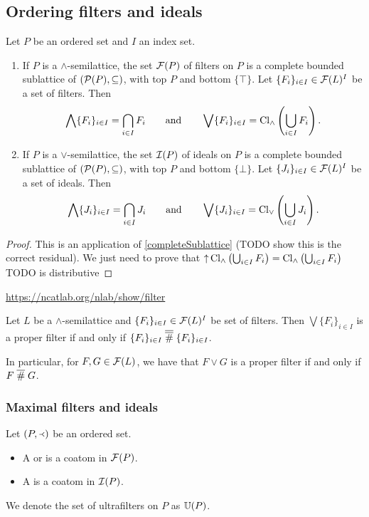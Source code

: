 \subsection{Ordering filters and ideals}

\begin{proposition} \label{latticeFiltersIdeals}
Let $P$ be an ordered set and $I$ an index set.
\begin{enumerate}
\item If $P$ is a $\wedge$-semilattice, the set $\operatorname{\mathcal{F}}(P)$ of filters on $P$ is a complete bounded sublattice of $\left( \operatorname{\mathcal{P}}(P), \subseteq \right)$, with top $P$ and bottom $\{\top\}$. Let $\{F_i\}_{i\in I} \in \operatorname{\mathcal{F}}(L)^I$ be a set of filters. Then
\[ \bigwedge \{F_i\}_{i\in I} = \bigcap_{i\in I}F_i \qquad\text{and}\qquad
\bigvee \{F_i\}_{i\in I} =  \operatorname{Cl}_\wedge\left(\bigcup_{i\in I}F_i\right). \]
\item If $P$ is a $\vee$-semilattice, the set $\operatorname{\mathcal{I}}(P)$ of ideals on $P$ is a complete bounded sublattice of $\left( \operatorname{\mathcal{P}}(P), \subseteq \right)$, with top $P$ and bottom $\{\bot\}$. Let $\{J_i\}_{i\in I} \in \operatorname{\mathcal{F}}(L)^I$ be a set of ideals. Then
\[ \bigwedge \{J_i\}_{i\in I} = \bigcap_{i\in I}J_i \qquad\text{and}\qquad
\bigvee \{J_i\}_{i\in I} =  \operatorname{Cl}_\vee\left(\bigcup_{i\in I}J_i\right). \]
\end{enumerate}
\end{proposition}
\begin{proof}
This is an application of \ref{completeSublattice} (TODO show this is the correct residual). We just need to prove that $\operatorname{\uparrow}\operatorname{Cl}_\wedge \left(\bigcup_{i\in I}F_i\right) = \operatorname{Cl}_\wedge \left(\bigcup_{i\in I}F_i\right)$ TODO is distributive
\end{proof}
\url{https://ncatlab.org/nlab/show/filter}

\begin{proposition} \label{joinProperFilter}
Let $L$ be a $\wedge$-semilattice and $\{F_i\}_{i\in I} \in \operatorname{\mathcal{F}}(L)^I$ be set of filters. Then $\bigvee \{F_i\}_{i\in I}$ is a proper filter \textup{if and only if} $\{F_i\}_{i\in I}\mathrel{\overline{\mathrel{\overline{\#}}}} \{F_i\}_{i\in I}$.
\end{proposition}
In particular, for $F, G\in\operatorname{\mathcal{F}}(L)$, we have that $F\vee G$ is a proper filter if and only if $F\mathrel{\overline{\#}} G$.

\subsubsection{Maximal filters and ideals}
\begin{definition}
Let $\left( P,\Yleft \right)$ be an ordered set.
\begin{itemize}
\item A  or  is a coatom in $\operatorname{\mathcal{F}}(P)$.
\item A  is a coatom in $\operatorname{\mathcal{I}}(P)$.
\end{itemize}
We denote the set of ultrafilters on $P$ as $\operatorname{\mathbb{U}}(P)$.
\end{definition}


